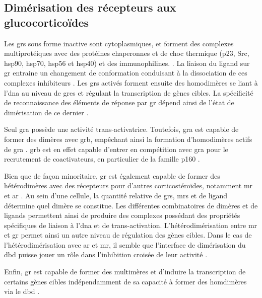 \documentclass[../main.tex]{subfiles}
\begin{document}
	\subsection{Dimérisation des récepteurs aux glucocorticoïdes}\label{subsubsec:gr-dimerisation}
		Les \glspl{gr} sous forme inactive sont cytoplasmiques, et forment des complexes multiprotéiques avec des protéines chaperonnes et de choc thermique (p23, Src, \gls{hsp90}, \gls{hsp70}, \gls{hsp56} et \gls{hsp40}) et des immunophilines. \citep{Baulieu1987,Pratt2006}.
		La liaison du ligand sur \gls{gr} entraine un changement de conformation conduisant à la dissociation de ces complexes inhibiteurs \citep{Groyer1987}.
		Les \glspl{gr} activés forment ensuite des homodimères \citep{Wrange1989} se liant à l'\gls{dna} au niveau de \glspl{gre} et régulant la transcription de gènes cibles.
		La spécificité de reconnaissance des éléments de réponse par \gls{gr} dépend ainsi de l'état de dimérisation de ce dernier \citep{Eriksson1990}.
		\par
		Seul \gls{gra} possède une activité trans-activatrice.
		Toutefois, \gls{gra} est capable de former des dimères avec \gls{grb}, empêchant ainsi la formation d'homodimères actifs de \gls{gra} \citep{Oakley1999}.
		\gls{grb} est en effet capable d'entrer en compétition avec \gls{gra} pour le recrutement de coactivateurs, en particulier de la famille p160 \citep{Yudt2003,Charmandari2005}.
		\par
		Bien que de façon minoritaire, \gls{gr} est également capable de former des hétérodimères avec des récepteurs pour d'autres corticostéroïdes, notamment \gls{mr} \citep{Trapp1994,Savory2001} et \gls{ar} \citep{Chen1997}.
		Au sein d'une cellule, la quantité relative de \glspl{gr}, \glspl{mr} et de ligand détermine quel dimère se constitue.
		Les différentes combinatoires de dimères et de ligands permettent ainsi de produire des complexes possédant des propriétés spécifiques de liaison à l'\gls{dna} et de trans-activation.
		L'hétérodimérisation entre \gls{mr} et \gls{gr} permet ainsi un autre niveau de régulation des gènes cibles.
		Dans le cas de l'hétérodimérisation avec \gls{ar} et \gls{mr}, il semble que l'interface de dimérisation du \gls{dbd} puisse jouer un rôle dans l'inhibition croisée de leur activité \citep{Chen1997,Liu1997}.
		\par
		Enfin, \gls{gr} est capable de former des multimères et d'induire la transcription de certains gènes cibles indépendamment de sa capacité à former des homdimères via le \gls{dbd} \citep{Adams2003}.
\end{document}
